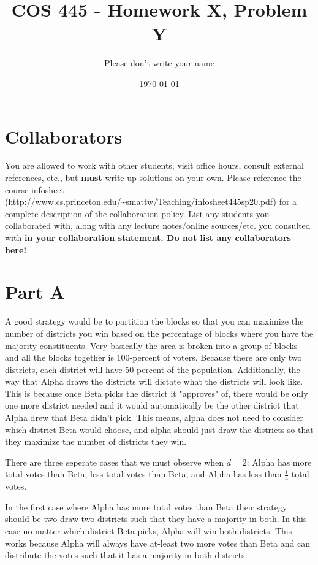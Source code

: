 \documentclass[12pt]{article}%
\begin{document}
\title{COS 445 - Homework X, Problem Y} %
\author{Please don't write your name} %
\date{\today}
\maketitle
\section*{Collaborators}
You are allowed to work with other students, visit office hours, consult external references, etc., but \textbf{must} write up solutions on your own.  Please reference the course infosheet (\url{http://www.cs.princeton.edu/~smattw/Teaching/infosheet445sp20.pdf}) for a complete description of the collaboration policy. List any students you collaborated with, along with any lecture notes/online sources/etc. you consulted with \textbf{in your collaboration statement. Do not list any collaborators here!}

\section*{Part A}

A good strategy would be to partition the blocks so that you can maximize the number of districts you win based on the percentage of blocks where you have the majority constituents. Very basically the area is broken into a group of blocks and all the blocks together is 100-percent of voters. Because there are only two districts, each district will have 50-percent of the population.  Additionally, the way that Alpha draws the districts will dictate what the districts will look like.  This is because once Beta picks the district it "approves" of, there would be only one more district needed and it would automatically be the other district that Alpha drew that Beta didn't pick. This means, alpha does not need to consider which district Beta would choose, and alpha should just draw the districts so that they maximize the number of districts they win.
\newline

There are three seperate cases that we must observe when $d = 2$:  Alpha has more total votes than Beta, less total votes than Beta, and Alpha has less than $\frac{1}{4}$ total votes.  
\newline

In the first case where Alpha has more total votes than Beta their strategy should be two draw two districts such that they have a majority in both.  In this case no matter which district Beta picks, Alpha will win both districts.  This works because Alpha will always have at-least two more votes than Beta and can distribute the votes such that it has a majority in both districts.
\newline
\end{document}
